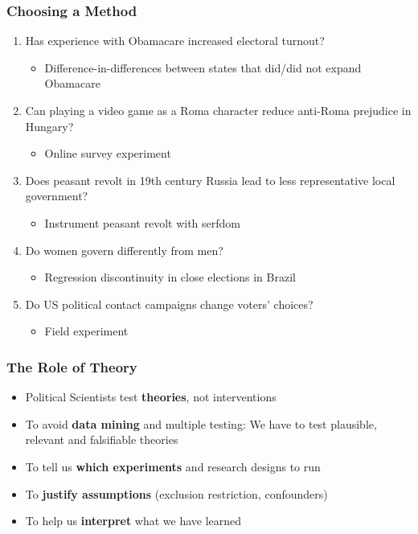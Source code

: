 \documentclass[xcolor=x11names,compress]{beamer}\usepackage[]{graphicx}\usepackage[]{color}
\renewcommand{\(}{\begin{columns}}
\renewcommand{\)}{\end{columns}}
\newcommand{\<}[1]{\begin{column}{#1}}
\renewcommand{\>}{\end{column}}
\begin{document}
\begin{frame}
\frametitle{Choosing a Method}
\begin{enumerate}
\item Has experience with Obamacare increased electoral turnout?
\pause
\begin{itemize}
\item Difference-in-differences between states that did/did not expand Obamacare
\pause
\end{itemize}
\item Can playing a video game as a Roma character reduce anti-Roma prejudice in Hungary?
\pause
\begin{itemize}
\item Online survey experiment
\pause
\end{itemize}
\item Does peasant revolt in 19th century Russia lead to less representative local government?
\pause
\begin{itemize}
\item Instrument peasant revolt with serfdom
\pause
\end{itemize}
\item Do women govern differently from men? 
\pause
\begin{itemize}
\item Regression discontinuity in close elections in Brazil
\pause
\end{itemize}
\item Do US political contact campaigns change voters' choices?
\pause
\begin{itemize}
\item Field experiment
\pause
\end{itemize}
\end{enumerate}
\end{frame}

\begin{frame}
\frametitle{The Role of Theory}
\begin{itemize}
\item Political Scientists test \textbf{theories}, not interventions
\pause
\item To avoid \textbf{data mining} and multiple testing: We have to test plausible, relevant and falsifiable theories
\pause
\item To tell us \textbf{which experiments} and research designs to run
\pause
\item To \textbf{justify assumptions} (exclusion restriction, confounders)
\pause
\item To help us \textbf{interpret} what we have learned
\end{itemize}
\end{frame}
\end{document}
